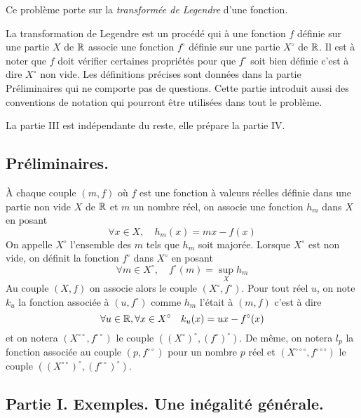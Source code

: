 
Ce problème porte sur la \emph{transformée de Legendre} d'une fonction.

La transformation de Legendre est un procédé qui à une fonction $f$ définie sur une partie $X$ de $\mathbb{R}$ associe une fonction $f^{\circ}$ définie sur une partie $X^{\circ}$ de $\mathbb{R}$.
Il est à noter que $f$ doit vérifier certaines propriétés pour que $f^{\circ}$ soit bien définie c'est à dire $X^{\circ}$ non vide.\newline
Les définitions précises sont données dans la partie Préliminaires qui ne comporte pas de questions. Cette partie introduit aussi des conventions de notation qui pourront être utilisées dans tout le problème.

La partie III est indépendante du reste, elle prépare la partie IV.

\subsection*{Préliminaires.}
\`A chaque couple $(m,f)$ o\`{u} $f$ est une fonction \`{a} valeurs r\'{e}elles d\'{e}finie dans une partie non vide $X$ de $\mathbb{R}$ et $m$ un nombre r\'{e}el, on associe une fonction $h_{m}$ dans $X$ en posant
\[
\forall x\in X,\mathbf{\quad }h_{m}(x)=mx-f(x)
\]
On appelle $X^{\circ }$ l'ensemble des $m$ tels que $h_{m}$ soit major\'{e}e. Lorsque $X^{\circ }$ est non vide, on d\'{e}finit la fonction $f^{\circ }$ dans $X^{\circ }$ en posant
\[
\forall m\in X^{\circ },\quad f^{\circ }(m)=\sup_{X}h_{m}
\]
Au couple $(X,f)$ on associe alors le couple $(X^{\circ },f^{\circ })$. Pour tout r\'{e}el $u$, on note $k_{u}$ la fonction associ\'{e}e \`{a} $(u,f^{\circ })$ comme $h_{m}$ l'\'{e}tait \`{a} $(m,f)$ c'est \`{a} dire
\[
\forall u\in \R ,\forall x\in X^{\circ }\mathbf{\quad }%
k_{u}(x)=ux-f^{\circ }(x)
\]
et on notera $(X^{\circ \circ },f^{\circ \circ })$ le couple $((X^{\circ})^{\circ },(f^{\circ })^{\circ })$. De m\^{e}me, on notera $l_{p}$ la fonction associ\'{e}e au couple $(p,f^{\circ \circ })$ pour un nombre $p$ r\'{e}el et $(X^{\circ \circ \circ },f^{\circ \circ \circ })$ le couple $%
((X^{\circ \circ })^{\circ },(f^{\circ \circ })^{\circ })$.

\subsection*{Partie I. Exemples. Une inégalité générale.}

